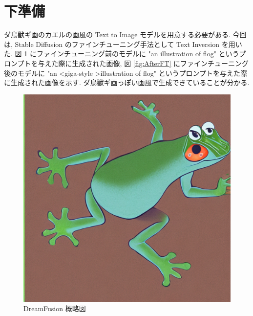 \documentclass{jarticle}     %
\begin{document}
\section{下準備}
ダ鳥獣ギ画のカエルの画風の Text to Image モデルを用意する必要がある. 
今回は, Stable Diffusion のファインチューニング手法として Text Inversion\cite{TextInversion} を用いた.
図 \ref{fig:beforeFT} にファインチューニング前のモデルに "an illustration of flog" というプロンプトを与えた際に生成された画像, 図 \ref{fig:AfterFT} にファインチューニング後のモデルに "an 	\textless giga-style \textgreater illustration of flog" というプロンプトを与えた際に生成された画像を示す.
ダ鳥獣ギ画っぽい画風で生成できていることが分かる.
\begin{figure}[ht]
  \centering
  \includegraphics[width=120mm]{assets/beforeFT.eps}
  \vspace{-0.3cm}
  \caption{DreamFusion 概略図}
  \label{fig:beforeFT}
\end{figure}
\end{document}
